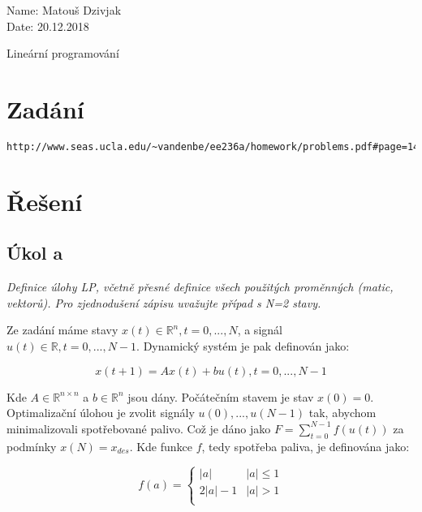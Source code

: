 \documentclass[10pt,a4paper,openright]{article}
\begin{document}
	\begin{flushleft}
		\large Name: Matouš Dzivjak\\
		\large Date: 20.12.2018\\
	\end{flushleft}
\begin{center}
	\huge Lineární programování
\end{center}
\section{Zadání}
\begin{verbatim}
http://www.seas.ucla.edu/~vandenbe/ee236a/homework/problems.pdf#page=14&zoom=auto,-248,211
\end{verbatim}


\section{Řešení}

\subsection{Úkol a}

\textit{Definice úlohy LP, včetně přesné definice všech použitých proměnných (matic, vektorů). 
Pro zjednodušení zápisu uvažujte případ s N=2 stavy.}
\vspace{.4cm}

Ze zadání máme stavy $x(t) \in \mathbb{R}^n, t = 0,...,N$, a signál
$u(t) \in \mathbb{R}, t = 0,...,N-1$. Dynamický systém je pak definován jako:

\begin{equation}
    x(t+1)=Ax(t) + bu(t), t=0,...,N-1
\end{equation}

Kde $A \in \mathbb{R}^{n \times n}$ a $b \in \mathbb{R}^n$ jsou dány.
Počátečním stavem je stav $x(0) = 0$. Optimalizační úlohou je zvolit 
signály $u(0),...,u(N-1)$ tak, abychom minimalizovali spotřebované palivo.
Což je dáno jako $F=\sum_{t=0}^{N-1}f(u(t))$ za podmínky $x(N)=x_{des}$.
Kde funkce $f$, tedy spotřeba paliva, je definována jako:

\begin{equation}\label{eq:fun}
f(a) = \begin{cases} 
    |a| & |a| \leq 1 \\
    2|a|-1 & |a| > 1 \\
 \end{cases}
\end{equation}
\end{document}
